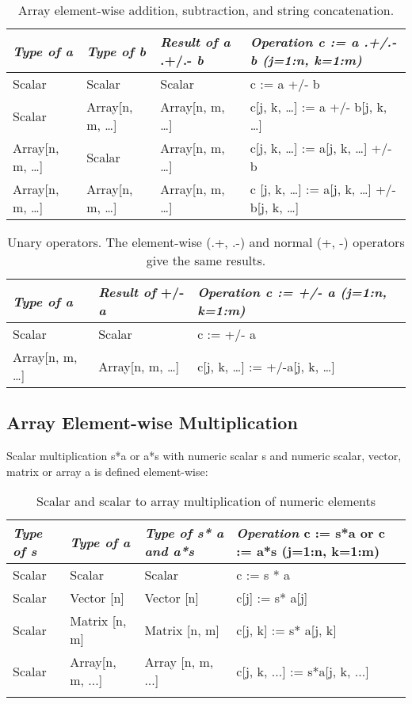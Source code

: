 \begin{longtable}[]{|l|l|l|l|}
\caption{Array element-wise addition, subtraction, and string concatenation.}\\
\hline
\emph{Type of a} & \emph{Type of b} & \emph{Result of a} .+/.- \emph{b}
& \emph{Operation c := a .+/.- b (j=1:n, k=1:m)}\\ \hline
\endhead
Scalar & Scalar & Scalar & c := a +/- b\\ \hline
Scalar & Array{[}n, m, \ldots{}{]} & Array{[}n, m, \ldots{}{]} & c{[}j,
k, \ldots{}{]} := a +/- b{[}j, k, \ldots{}{]}\\ \hline
Array{[}n, m, \ldots{}{]} & Scalar & Array{[}n, m, \ldots{}{]} & c{[}j,
k, \ldots{}{]} := a{[}j, k, \ldots{}{]} +/- b\\ \hline
Array{[}n, m, \ldots{}{]} & Array{[}n, m, \ldots{}{]} & Array{[}n, m,
\ldots{}{]} & c {[}j, k, \ldots{}{]} := a{[}j, k, \ldots{}{]} +/- b{[}j,
k, \ldots{}{]}\\ \hline

\end{longtable}

\begin{longtable}[]{|l|l|l|}
\caption{Unary operators. The element-wise (.+, .-) and normal (+, -) operators give the same results.}\\
\hline
\emph{Type of a} & \emph{Result of} +/- \emph{a} & \emph{Operation c :=
+/- a (j=1:n, k=1:m)}\\ \hline
\endhead
Scalar & Scalar & c := +/- a\\ \hline
Array{[}n, m, \ldots{}{]} & Array{[}n, m, \ldots{}{]} & c{[}j, k,
\ldots{}{]} := +/-a{[}j, k, \ldots{}{]}\\ \hline

\end{longtable}

\subsection{Array Element-wise Multiplication}

Scalar multiplication s*a or a*s with numeric scalar s and numeric
scalar, vector, matrix or array a is defined element-wise:

\begin{longtable}[]{|l|l|l|l|}
\caption{Scalar and scalar to array multiplication of numeric elements}\\
\hline
\emph{Type of s} & \emph{Type of a} & \emph{Type of s* a and a*s} &
\emph{Operation} c := s*a or c := a*s (j=1:n, k=1:m)\\ \hline
\endhead
Scalar & Scalar & Scalar & c := s * a\\ \hline
Scalar & Vector {[}n{]} & Vector {[}n{]} & c{[}j{]} := s*
a{[}j{]}\\ \hline
Scalar & Matrix {[}n, m{]} & Matrix {[}n, m{]} & c{[}j, k{]} := s*
a{[}j, k{]}\\ \hline
Scalar & Array{[}n, m, ...{]} & Array {[}n, m, ...{]} & c{[}j, k, ...{]}
:= s*a{[}j, k, ...{]}\\ \hline
\label{tab:product}
\end{longtable}


